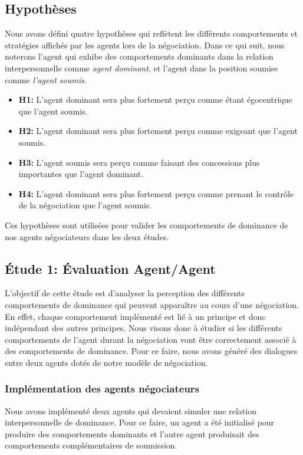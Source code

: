 		\subsection{Hypothèses}
				
				Nous avons défini quatre hypothèses qui reflètent les différents comportements et stratégies affichés par les agents lors de la négociation. Dans ce qui suit, nous noterons l'agent qui exhibe des comportements dominants dans la relation interpersonnelle comme \emph{agent dominant}, et l'agent dans la position soumise comme \emph{l'agent soumis}.
				
				\begin{itemize}
					\item \textbf {H1:} L'agent dominant sera plus fortement perçu comme étant égocentrique que l'agent soumis.
					
					\item \textbf {H2:} L'agent dominant sera plus fortement perçu comme exigeant que l'agent soumis.
					
					\item \textbf {H3:} L'agent soumis sera perçu comme faisant des concessions plus importantes que l'agent dominant.
					
					\item \textbf {H4:} L'agent dominant sera plus fortement perçu comme prenant le contrôle de la négociation que l'agent soumis.
					
				\end{itemize}
				
				Ces hypothèses sont utilisées pour valider les comportements de dominance de nos agents négociateurs dans les deux études. 
				
		\subsection{Étude 1: Évaluation Agent/Agent}
				L'objectif de cette étude est d'analyser la perception des différents comportements de dominance qui peuvent apparaître au cours d'une négociation. En effet, chaque comportement implémenté est lié à un principe et donc indépendant des autres principes. Nous visons donc à étudier si les différents comportements de l'agent durant la négociation vont être correctement associé à des comportements de dominance. Pour ce faire, nous avons généré des dialogues entre deux agents dotés de notre modèle de négociation. 
			
			\subsubsection{Implémentation des agents négociateurs}
				Nous avons implémenté deux agents qui devaient simuler une relation interpersonnelle de dominance. Pour ce faire, un agent a été initialisé pour produire des comportements dominants et l'autre agent produisait des comportements complémentaires de soumission. 
				
